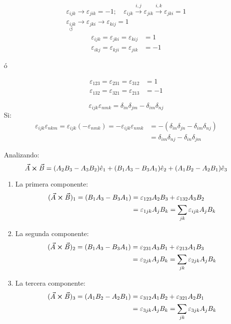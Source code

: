 \documentclass[../main]{subfiles}
\begin{document}
\begin{align*}
    \varepsilon_{ijk} \rightarrow \varepsilon_{jik}=-1; \quad \varepsilon_{ijk} \xrightarrow{i,j} \varepsilon_{jik} \xrightarrow{i,k} \varepsilon_{jki}=1 \\
    \underset{\circlearrowleft}{\varepsilon_{ijk}} \rightarrow \varepsilon_{jki} \rightarrow \varepsilon_{kij}=1 
\end{align*}
\begin{align*}
    \varepsilon_{ijk}=\varepsilon_{jki}=\varepsilon_{kij}&=1 \\
    \varepsilon_{ikj}=\varepsilon_{kji}=\varepsilon_{jik}&=-1
\end{align*}
\centerline{ó}
\begin{align*}
    \varepsilon_{123}=\varepsilon_{231}=\varepsilon_{312}&=1 \\
    \varepsilon_{132}=\varepsilon_{321}=\varepsilon_{213}&=-1
\end{align*}
\begin{nota}{}
    \begin{equation}
        \varepsilon_{ijk}\varepsilon_{nmk}=\delta_{in}\delta_{jm}-\delta_{im}\delta_{nj} 
    \end{equation}
    Si:
    \begin{align*}
        \varepsilon_{ijk} \varepsilon_{nkm}= \varepsilon_{ijk}(-\varepsilon_{nmk})=-\varepsilon_{ijk} \varepsilon_{nmk}&=-(\delta_{in}\delta_{jn}-\delta_{im}\delta_{nj}) \\
        &=\delta_{im}\delta_{nj}-\delta_{in}\delta_{jm}
    \end{align*}
\end{nota}
Analizando:
\begin{equation*}
    \vec{A} \cross \vec{B}=(A_2 B_3-A_3 B_2)\hat{e}_1+(B_1 A_3-B_3 A_1)\hat{e}_2+(A_1 B_2-A_2 B_1)\hat{e}_3
\end{equation*}
\begin{enumerate}
    \item La primera componente:
    \begin{align*}
        (\vec{A} \cross \vec{B})_1 =(B_1 A_3-B_3 A_1)&=\varepsilon_{123} A_2 B_3+\varepsilon_{132} A_3 B_2 \\
        &=\varepsilon_{1jk} A_j B_k=\sum_{jk} \varepsilon_{ijk} A_j B_k
    \end{align*}
    \item La segunda componente:
    \begin{align*}
        (\vec{A} \cross \vec{B})_2=(B_1 A_3-B_3 A_1)&=\varepsilon_{231} A_3 B_1+\varepsilon_{213}A_1 B_3 \\
        &=\varepsilon_{2jk} A_j B_k=\sum_{jk} \varepsilon_{2jk} A_j B_k
    \end{align*}
    \item La tercera componente:
    \begin{align*}
        (\vec{A} \cross \vec{B})_3=(A_1 B_2-A_2 B_1)&=\varepsilon_{312}A_1 B_2+\varepsilon_{321}A_2 B_1 \\
        &=\varepsilon_{3jk}A_j B_k=\sum_{jk} \varepsilon_{3jk}A_j B_k
    \end{align*}
\end{enumerate}
\end{document}
